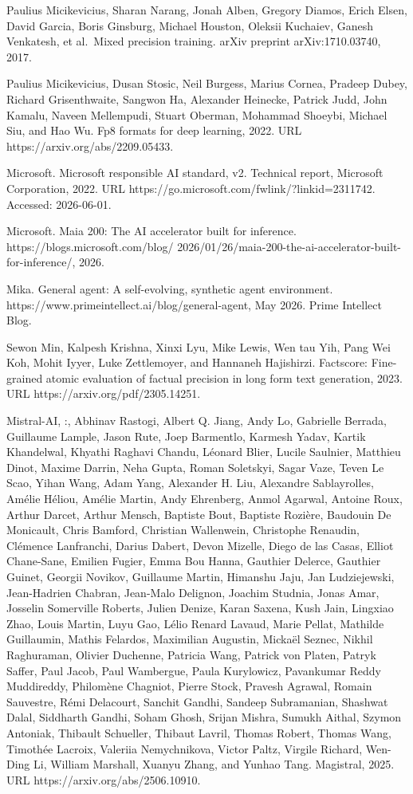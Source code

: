 \documentclass[
  10
]{article}
\begin{document}
Paulius Micikevicius, Sharan Narang, Jonah Alben, Gregory Diamos, Erich
Elsen, David Garcia, Boris Ginsburg, Michael Houston, Oleksii Kuchaiev,
Ganesh Venkatesh, et al.~Mixed precision training. arXiv preprint
arXiv:1710.03740, 2017.

Paulius Micikevicius, Dusan Stosic, Neil Burgess, Marius Cornea, Pradeep
Dubey, Richard Grisenthwaite, Sangwon Ha, Alexander Heinecke, Patrick
Judd, John Kamalu, Naveen Mellempudi, Stuart Oberman, Mohammad Shoeybi,
Michael Siu, and Hao Wu. Fp8 formats for deep learning, 2022. URL https://arxiv.org/abs/2209.05433.

Microsoft. Microsoft responsible AI standard, v2. Technical report,
Microsoft Corporation, 2022. URL
https://go.microsoft.com/fwlink/?linkid=2311742. Accessed: 2026-06-01.

Microsoft. Maia 200: The AI accelerator built for inference.
https://blogs.microsoft.com/blog/
2026/01/26/maia-200-the-ai-accelerator-built-for-inference/, 2026.

Mika. General agent: A self-evolving, synthetic agent environment.
https://www.primeintellect.ai/blog/general-agent, May 2026. Prime
Intellect Blog.

Sewon Min, Kalpesh Krishna, Xinxi Lyu, Mike Lewis, Wen tau Yih, Pang Wei
Koh, Mohit Iyyer, Luke Zettlemoyer, and Hannaneh Hajishirzi. Factscore:
Fine-grained atomic evaluation of factual precision in long form text
generation, 2023. URL https://arxiv.org/pdf/2305.14251.



Mistral-AI, :, Abhinav Rastogi, Albert Q. Jiang, Andy Lo, Gabrielle
Berrada, Guillaume Lample, Jason Rute, Joep Barmentlo, Karmesh Yadav,
Kartik Khandelwal, Khyathi Raghavi Chandu, Léonard Blier, Lucile
Saulnier, Matthieu Dinot, Maxime Darrin, Neha Gupta, Roman Soletskyi,
Sagar Vaze, Teven Le Scao, Yihan Wang, Adam Yang, Alexander H. Liu,
Alexandre Sablayrolles, Amélie Héliou, Amélie Martin, Andy Ehrenberg,
Anmol Agarwal, Antoine Roux, Arthur Darcet, Arthur Mensch, Baptiste
Bout, Baptiste Rozière, Baudouin De Monicault, Chris Bamford, Christian
Wallenwein, Christophe Renaudin, Clémence Lanfranchi, Darius Dabert,
Devon Mizelle, Diego de las Casas, Elliot Chane-Sane, Emilien Fugier,
Emma Bou Hanna, Gauthier Delerce, Gauthier Guinet, Georgii Novikov,
Guillaume Martin, Himanshu Jaju, Jan Ludziejewski, Jean-Hadrien Chabran,
Jean-Malo Delignon, Joachim Studnia, Jonas Amar, Josselin Somerville
Roberts, Julien Denize, Karan Saxena, Kush Jain, Lingxiao Zhao, Louis
Martin, Luyu Gao, Lélio Renard Lavaud, Marie Pellat, Mathilde
Guillaumin, Mathis Felardos, Maximilian Augustin, Mickaël Seznec, Nikhil
Raghuraman, Olivier Duchenne, Patricia Wang, Patrick von Platen, Patryk
Saffer, Paul Jacob, Paul Wambergue, Paula Kurylowicz, Pavankumar Reddy
Muddireddy, Philomène Chagniot, Pierre Stock, Pravesh Agrawal, Romain
Sauvestre, Rémi Delacourt, Sanchit Gandhi, Sandeep Subramanian, Shashwat
Dalal, Siddharth Gandhi, Soham Ghosh, Srijan Mishra, Sumukh Aithal,
Szymon Antoniak, Thibault Schueller, Thibaut Lavril, Thomas Robert,
Thomas Wang, Timothée Lacroix, Valeriia Nemychnikova, Victor Paltz,
Virgile Richard, Wen-Ding Li, William Marshall, Xuanyu Zhang, and Yunhao
Tang. Magistral, 2025. URL https://arxiv.org/abs/2506.10910.
\end{document}
